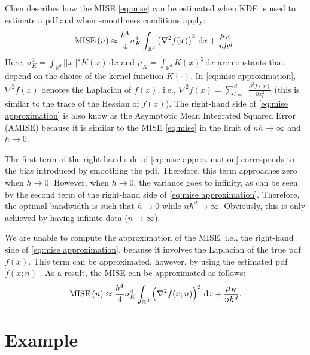 \documentclass[10pt,final,a4paper,oneside,onecolumn]{article}
\newcommand*{\ud}{\mathrm{\,d}}                                 %
\newcommand{\mise}[1]{\textup{MISE} \left( #1 \right)}
\theoremstyle{plain}\newtheorem{definition}{Definition}[section]    %
\theoremstyle{definition}\newtheorem{example}{Example}[section]     %
\theoremstyle{remark}\newtheorem{remarkenv}{Remark}[section]        %
\begin{document}
Chen \cite{chen2017tutorial} describes how the MISE \cref{eq:mise} can be estimated when KDE is used to estimate a pdf and when smoothness conditions apply:
\begin{equation} \label{eq:mise approximation}
	\mise{n} \approx \frac{h^4}{4} \sigma_K^4 \int_{\mathbb{R}^d} \left(\nabla^2 f(x)\right)^2 \, \textup{d}x + \frac{\mu_K}{nh^d}.
\end{equation}
Here, $\sigma_K^2 = \int_{\mathbb{R}^d} ||x||^2 K(x) \ud x$ and $\mu_K = \int_{\mathbb{R}^d} K(x)^2 \ud x$ are constants that depend on the choice of the kernel function $K(\cdot)$. In \cref{eq:mise approximation}, $\nabla^2 f(x)$ denotes the Laplacian of $f(x)$, i.e., $\nabla^2 f(x) = \sum_{l=1}^d \frac{\partial^2 f(x)}{\partial x_l^2}$ (this is similar to the trace of the Hessian of $f(x)$). The right-hand side of \cref{eq:mise approximation} is also know as the Asymptotic Mean Integrated Squared Error (AMISE) because it is similar to the MISE \cref{eq:mise} in the limit of $nh \rightarrow \infty$ and $h \rightarrow 0$.

The first term of the right-hand side of \cref{eq:mise approximation} corresponds to the bias introduced by smoothing the pdf. Therefore, this term approaches zero when $h \rightarrow 0$. However, when $h \rightarrow 0$, the variance goes to infinity, as can be seen by the second term of the right-hand side of \cref{eq:mise approximation}. Therefore, the optimal bandwidth is such that $h \rightarrow 0$ while $nh^d \rightarrow \infty$. Obviously, this is only achieved by having infinite data ($n \rightarrow \infty$).

We are unable to compute the approximation of the MISE, i.e., the right-hand side of \cref{eq:mise approximation}, because it involves the Laplacian of the true pdf $f(x)$. This term can be approximated, however, by using the estimated pdf $\hat{f}(x;n)$ \cite{calonico2018effect}. As a result, the MISE can be approximated as follows:
\begin{equation} \label{eq:mise final approximation}
	\mise{n} \approx \frac{h^4}{4} \sigma_K^4 \int_{\mathbb{R}^d} \left(\nabla^2 \hat{f}(x;n)\right)^2 \, \textup{d}x + \frac{\mu_K}{nh^d}.
\end{equation}



\section{Example}
\label{sec:example}
\end{document}
